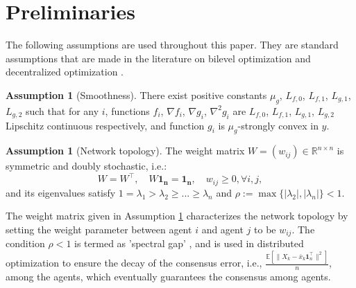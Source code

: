 \documentclass{article}
\theoremstyle{plain}
\theoremstyle{definition}
\newtheorem{assumption}[theorem]{Assumption}
\theoremstyle{remark}
\newcommand{\E}{\mathbb{E}}
\newcommand{\bfonet}{\mathbf{1}^{\top}}
\begin{document}
\section{Preliminaries}
The following assumptions are used throughout this paper. They are standard assumptions that are made in the literature on bilevel optimization \citep{ghadimi2018approximation,hong2020two,chen2021closing,ji2021bilevel, huang2022efficiently} and decentralized optimization \citep{qu2017harnessing, nedic2017achieving, lian2017can, tang2018d}.

\begin{assumption}[Smoothness]\label{assump: lip_convexity}
    There exist positive constants $\mu_g$, $L_{f,0}$, $L_{f,1}$, $L_{g,1}$, $L_{g,2}$ such that for any $i$, functions $f_i$, $\nabla f_i$, $\nabla g_i$, $\nabla^2g_i$ are $L_{f,0}$, $L_{f,1}$, $L_{g,1}$, $L_{g,2}$ Lipschitz continuous respectively, and function $g_i$ is $\mu_g$-strongly convex in $y$.
\end{assumption}

\begin{assumption}[Network topology]\label{assump: W}
    The weight matrix $W = (w_{ij})\in \mathbb{R}^{n\times n}$ is symmetric and doubly stochastic, i.e.:
    \[
        W = W^{\top},\quad W\mathbf{1_n} = \mathbf{1_n},\quad w_{ij}\geq 0,\forall i,j,
    \]
    and its eigenvalues satisfy $1 = \lambda_1> \lambda_2\geq ...\geq \lambda_n$ and $\rho := \max\{|\lambda_2|, |\lambda_n|\} < 1$.
\end{assumption}
The weight matrix given in Assumption \ref{assump: W} characterizes the network topology by setting the weight parameter between agent $i$ and agent $j$ to be $w_{ij}$. The condition $\rho < 1$ is termed as 'spectral gap' \citep{lian2017can}, and is used in distributed optimization to ensure the decay of the consensus error, i.e., $\frac{\E\left[\|X_k - \bar{x}_k\bfonet_n\|^2\right]}{n}$, among the agents, which eventually guarantees the consensus among agents.
\end{document}
